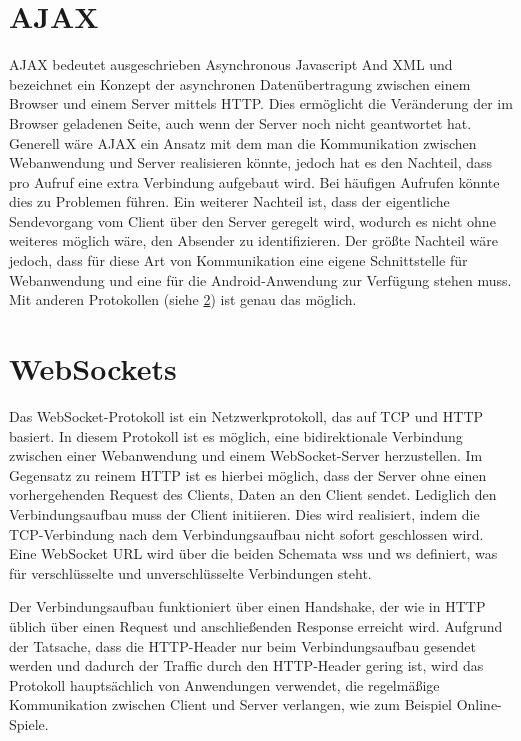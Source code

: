 \section{AJAX}
AJAX bedeutet ausgeschrieben Asynchronous Javascript And XML und bezeichnet ein Konzept der asynchronen Datenübertragung zwischen einem Browser und einem Server mittels HTTP. Dies ermöglicht die Veränderung der im Browser geladenen Seite, auch wenn der Server noch nicht geantwortet hat. \\
Generell wäre AJAX ein Ansatz mit dem man die Kommunikation zwischen Webanwendung und Server realisieren könnte, jedoch hat es den Nachteil, dass pro Aufruf eine extra Verbindung aufgebaut wird. Bei häufigen Aufrufen könnte dies zu Problemen führen. Ein weiterer Nachteil ist, dass der eigentliche Sendevorgang vom Client über den Server geregelt wird, wodurch es nicht ohne weiteres möglich wäre, den Absender zu identifizieren. Der größte Nachteil wäre jedoch, dass für diese Art von Kommunikation eine eigene Schnittstelle für Webanwendung und eine für die Android-Anwendung zur Verfügung stehen muss. Mit anderen Protokollen (siehe \ref{sec:websockets}) ist genau das möglich.


\section{WebSockets}
\label{sec:websockets}
Das WebSocket-Protokoll ist ein Netzwerkprotokoll, das auf TCP und HTTP basiert. In diesem Protokoll ist es möglich, eine bidirektionale Verbindung zwischen einer Webanwendung und einem WebSocket-Server herzustellen. Im Gegensatz zu reinem HTTP ist es hierbei möglich, dass der Server ohne einen vorhergehenden Request des Clients, Daten an den Client sendet. Lediglich den Verbindungsaufbau muss der Client initiieren. Dies wird realisiert, indem die TCP-Verbindung nach dem Verbindungsaufbau nicht sofort geschlossen wird. 
Eine WebSocket URL wird über die beiden Schemata wss und ws definiert, was für verschlüsselte und unverschlüsselte Verbindungen steht.

Der Verbindungsaufbau funktioniert über einen Handshake, der wie in HTTP üblich über einen Request und anschließenden Response erreicht wird. Aufgrund der Tatsache, dass die HTTP-Header nur beim Verbindungsaufbau gesendet werden und dadurch der Traffic durch den HTTP-Header gering ist, wird das Protokoll hauptsächlich von Anwendungen verwendet, die regelmäßige Kommunikation zwischen Client und Server verlangen, wie zum Beispiel Online-Spiele. \\

